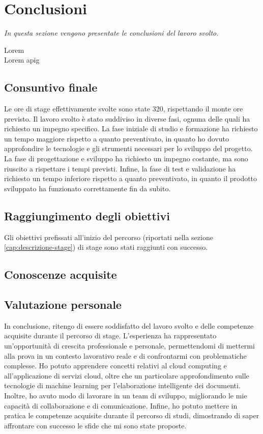 \chapter{Conclusioni}
\label{cap:conclusioni}
\emph{In questa sezione vengono presentate le conclusioni del lavoro svolto.}

Lorem 
\\
Lorem \gls{apig}

\section{Consuntivo finale}

Le ore di stage effettivamente svolte sono state 320, rispettando il monte ore previsto. Il lavoro svolto è stato suddiviso in diverse fasi, ognuna delle quali ha richiesto un impegno specifico. La fase iniziale di studio e formazione ha richiesto un tempo maggiore rispetto a quanto preventivato, in quanto ho dovuto approfondire le tecnologie e gli strumenti necessari per lo sviluppo del progetto. La fase di progettazione e sviluppo ha richiesto un impegno costante, ma sono riuscito a rispettare i tempi previsti. Infine, la fase di test e validazione ha richiesto un tempo inferiore rispetto a quanto preventivato, in quanto il prodotto sviluppato ha funzionato correttamente fin da subito.

\section{Raggiungimento degli obiettivi}
Gli obiettivi prefissati all'inizio del percorso (riportati nella sezione \ref{cap:descrizione-stage}) di stage sono stati raggiunti con successo. 


\section{Conoscenze acquisite}

\section{Valutazione personale}
In conclusione, ritengo di essere soddisfatto del lavoro svolto e delle competenze acquisite durante il percorso di stage. L'esperienza ha rappresentato un'opportunità di crescita professionale e personale, permettendomi di mettermi alla prova in un contesto lavorativo reale e di confrontarmi con problematiche complesse. Ho potuto apprendere concetti relativi al cloud computing e all'applicazione di servizi cloud, oltre che un particolare approfondimento sulle tecnologie di machine learning per l'elaborazione intelligente dei documenti. Inoltre, ho avuto modo di lavorare in un team di sviluppo, migliorando le mie capacità di collaborazione e di comunicazione. Infine, ho potuto mettere in pratica le competenze acquisite durante il percorso di studi, dimostrando di saper affrontare con successo le sfide che mi sono state proposte.
